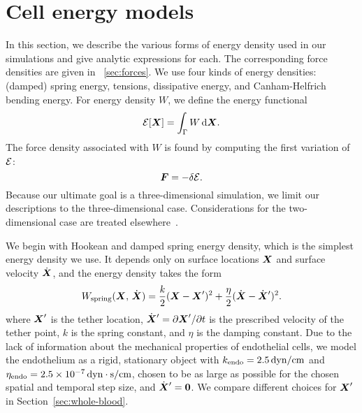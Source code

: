 \section{Cell energy models}\label{sec:energy}

In this section, we describe the various forms of energy density used in our simulations
and give analytic expressions for each. The corresponding force densities are given in~%
\ref{sec:forces}. We use four kinds of energy densities: (damped) spring energy,
tensions, dissipative energy, and Canham-Helfrich bending energy. For energy density $W$,
we define the energy functional
\begin{equation*}
    \energy[\X] = \int_\interface W \d\X.
\end{equation*}
The force density associated with $W$ is found by computing the first variation of
$\mathcal{E}$: 
\begin{equation}
    \boldsymbol{F} = -\delta\mathcal{E}.
\end{equation}
Because our ultimate goal is a three-dimensional simulation, we limit our descriptions to
the three-dimensional case. Considerations for the two-dimensional case are treated
elsewhere~\cite{Peskin:2002go,Erickson:2010uzba}.

We begin with Hookean and damped spring energy density, which is the simplest energy
density we use. It depends only on surface locations $\boldsymbol{X}$ and surface velocity $\dot{\boldsymbol{X}}$, and
the energy density takes the form
\begin{equation}
    W_\text{spring}(\boldsymbol{X},\,\dot{\boldsymbol{X}}) = \frac{k}2 (\boldsymbol{X} - \boldsymbol{X}')^2 + \frac{\eta}2(\dot{\boldsymbol{X}} - \dot{\boldsymbol{X}}')^2.
\end{equation}
where $\boldsymbol{X}'$ is the tether location, $\dot{\boldsymbol{X}}' = \partial\boldsymbol{X}'/\partial t$ is the prescribed
velocity of the tether point, $k$ is the spring constant, and $\eta$ is the damping
constant. Due to the lack of information about the mechanical properties of endothelial
cells, we model the endothelium as a rigid, stationary object with
$k_\text{endo} = 2.5\dynpercm$ and $\eta_\text{endo} = 2.5\times 10^{-7}\dynsecpercm$,
chosen to be as large as possible for the chosen spatial and temporal step size, and
$\dot{\boldsymbol{X}}' = \boldsymbol{0}$. We compare different choices for $\boldsymbol{X}'$ in Section~\ref{sec:whole-blood}.

